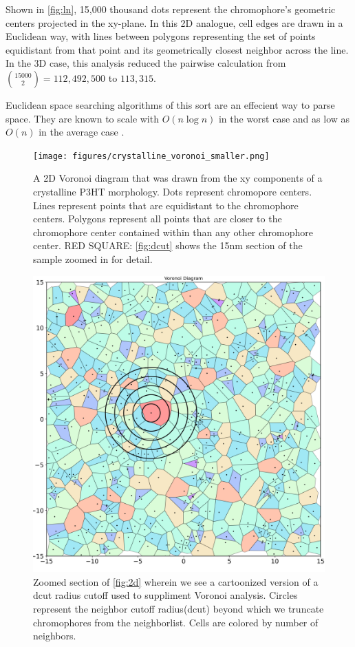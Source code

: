 Shown in \autoref{fig:ln}, 15,000 thousand dots represent the chromophore's geometric centers projected
in the xy-plane. In this 2D analogue,
cell edges are drawn in a Euclidean way, with lines between polygons representing the set of points 
equidistant from that point and its geometrically closest neighbor across the line. 
In the 3D case, this analysis reduced the pairwise calculation from ${15000 \choose 2} = 112,492,500$
to $113,315$. 

Euclidean space searching algorithms of this sort are an effecient way to parse space. 
They are known to scale with $O(n\log{n})$ in the worst case and as low as $O(n)$ in the average case
\cite{Bentley1980}.


\begin{figure}
  \center
  \texttt{[image: figures/crystalline\_voronoi\_smaller.png]} 
  \caption{A 2D Voronoi diagram that was drawn from the xy components of a crystalline P3HT morphology. Dots
    represent chromopore centers. Lines represent points that are equidistant to the chromophore centers.
    Polygons represent all points that are closer to the chromophore center contained within than any other
    chromophore center. RED SQUARE: \autoref{fig:dcut} shows the 15nm section of the sample zoomed in for
    detail.}
  \label{fig:2d}
\end{figure}
\begin{figure}
  \center
  \includegraphics[width=\linewidth]{figures/crystalline_voronoi_d_cut_circles.png} 
    \caption{Zoomed section of \autoref{fig:2d} wherein we see a cartoonized version of a dcut radius cutoff
    used to suppliment Voronoi analysis. Circles represent the neighbor cutoff
    radius(dcut) beyond which we truncate chromophores from the neighborlist.
    Cells are colored by number of neighbors.}
  \label{fig:dcut}
\end{figure}

